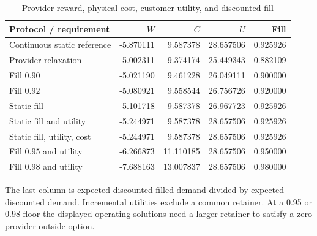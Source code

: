 \begin{table}[htbp]
\centering
\caption{Provider reward, physical cost, customer utility, and discounted fill}\label{tab:r6frontier}
\small
\begin{tabular}{lrrrr}
\toprule
Protocol / requirement & $W$ & $C$ & $U$ & Fill \\
\midrule
Continuous static reference & -5.870111 & 9.587378 & 28.657506 & 0.925926 \\
Provider relaxation & -5.002311 & 9.374174 & 25.449343 & 0.882109 \\
Fill $0.90$ & -5.021190 & 9.461228 & 26.049111 & 0.900000 \\
Fill $0.92$ & -5.080921 & 9.558544 & 26.756726 & 0.920000 \\
Static fill & -5.101718 & 9.587378 & 26.967723 & 0.925926 \\
Static fill and utility & -5.244971 & 9.587378 & 28.657506 & 0.925926 \\
Static fill, utility, cost & -5.244971 & 9.587378 & 28.657506 & 0.925926 \\
Fill $0.95$ and utility & -6.266873 & 11.110185 & 28.657506 & 0.950000 \\
Fill $0.98$ and utility & -7.688163 & 13.007837 & 28.657506 & 0.980000 \\
\bottomrule
\end{tabular}
\par\smallskip\begin{minipage}{0.96\textwidth}\footnotesize The last column is expected discounted filled demand divided by expected discounted demand. Incremental utilities exclude a common retainer. At a 0.95 or 0.98 floor the displayed operating solutions need a larger retainer to satisfy a zero provider outside option.\end{minipage}
\end{table}
